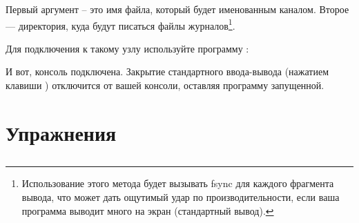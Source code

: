 Первый аргумент -- это имя файла, который будет именованным каналом. Второе --- директория, куда будут писаться файлы журналов\footnote{Использование этого метода будет вызывать fsync для каждого фрагмента вывода, что может дать ощутимый удар по производительности, если ваша программа выводит много на экран (стандартный вывод).}.

Для подключения к такому узлу используйте программу :


И вот, консоль подключена. Закрытие стандартного ввода-вывода (нажатием клавиши ) отключится от вашей консоли, оставляя программу запущенной.


\section{Упражнения}

\subsection*{\ReviewTitle{}}

